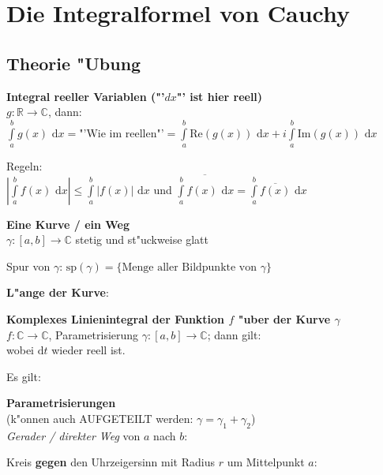 \section{Die Integralformel von Cauchy}
\subsection{Theorie "Ubung}
\textbf{Integral reeller Variablen ("'\(dx\)"' ist hier reell)}\\
\(g: \mathbb{R} \to \mathbb{C}\), dann:\\
\(\int\limits_a^b g(x) \text{ d}x = \text{"'Wie im reellen"'}
= \int\limits_a^b \text{Re}(g(x))\text{ d}x + i \int\limits_a^b \text{Im}(g(x))\text{ d}x\)

Regeln:\\
\(\left\vert \int\limits_a^b f(x) \text{ d}x \right\vert \leqslant \int\limits_a^b\vert f(x) \vert \text{ d}x\)
und \(\overline{\int\limits_a^bf(x)\text{ d}x} 	= \int\limits_a^b \overline{f(x)} \text{ d}x\)

\textbf{Eine Kurve / ein Weg}\\
\(\gamma: [a,b] \to \mathbb{C}\) stetig und st"uckweise glatt

Spur von \(\gamma\): \(\text{sp}(\gamma)=\{\text{Menge aller Bildpunkte von }\gamma\}\)

\textbf{L"ange der Kurve}: 

\textbf{Komplexes Linienintegral der Funktion \(f\) "uber der Kurve \(\gamma\)}\\
\(f: \mathbb{C} \to \mathbb{C}\), Parametrisierung \(\gamma: [a,b] \to \mathbb{C}\); dann gilt:\\
wobei \(\text{d}t\) wieder reell ist.

Es gilt: 

\textbf{Parametrisierungen}\\
(k"onnen auch AUFGETEILT werden: \(\gamma = \gamma_1 + \gamma_2\))\\
\emph{Gerader / direkter Weg} von \(a\) nach \(b\):\\

Kreis \textbf{gegen} den Uhrzeigersinn mit Radius \(r\) um Mittelpunkt \(a\):\\

